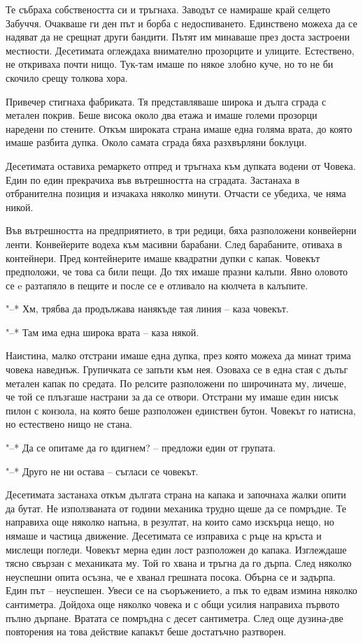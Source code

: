 \documentclass[ebook,openany,12pt]{memoir}
\begin{document}
Те събраха собствеността си и тръгнаха. Заводът се намираше край селцето Забуччя. Очакваше ги ден път и борба с недоспиването. Единствено можеха да се надяват да не срещнат други бандити. Пътят им минаваше през доста застроени местности. Десетимата оглеждаха внимателно прозорците и улиците. Естествено, не откриваха почти нищо. Тук-там имаше по някое злобно куче, но то не би скочило срещу толкова хора. 

Привечер стигнаха фабриката. Тя представляваше широка и дълга сграда с метален покрив. Беше висока около два етажа и имаше големи прозорци наредени по стените. Откъм широката страна имаше една голяма врата, до която имаше разбита дупка. Около самата сграда бяха разхвърляни боклуци.

Десетимата оставиха ремаркето отпред и тръгнаха към дупката водени от Човека. Един по един прекрачиха във вътрешността на сградата. Застанаха в отбранителна позиция и изчакаха няколко минути. Отчасти се убедиха, че няма никой.

Във вътрешността на предприятието, в три редици, бяха разположени конвейерни ленти. Конвейерите водеха към масивни барабани. След барабаните, отиваха в контейнери. Пред контейнерите имаше квадратни дупки с капак. Човекът предположи, че това са били пещи. До тях имаше празни калъпи. Явно оловото се e разтапяло в пещите и после се е отливало на кюлчета в калъпите.

"--* Хм, трябва да продължава нанякъде тая линия – каза човекът.

"--* Там има една широка врата – каза някой.

Наистина, малко отстрани имаше една дупка, през която можеха да минат трима човека наведнъж. Групичката се запъти към нея. Озоваха се в една стая с дълъг метален капак по средата. По релсите разположени по широчината му, личеше, че той се плъзгаше настрани за да се отвори. Отстрани му имаше един нисък пилон с конзола, на която беше разположен единствен бутон. Човекът го натисна, но естествено нищо не стана.

"--* Да се опитаме да го вдигнем? – предложи един от групата.

"--* Друго не ни остава – съгласи се човекът.

Десетимата застанаха откъм дългата страна на капака и започнаха жалки опити да бутат. Не използваната от години механика трудно щеше да се помръдне. Те направиха още няколко напъна, в резултат, на които само изскърца нещо, но нямаше и частица движение. Десетимата се изправиха с ръце на кръста и мислещи погледи. Човекът мерна един лост разположен до капака. Изглеждаше тясно свързан с механиката му. Той го хвана и тръгна да го дърпа. След няколко неуспешни опита осъзна, че е хванал грешната посока. Обърна се и задърпа. Един път – неуспешен. Увеси се на съоръжението, а пък то едвам измина няколко сантиметра. Дойдоха още няколко човека и с общи усилия направиха първото пълно дърпане. Вратата се помръдна с десет сантиметра. След още дузина-две повторения на това действие капакът беше достатъчно разтворен.
\end{document}
